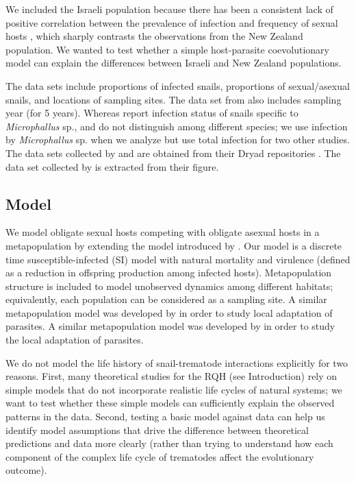 \documentclass{article}\usepackage[]{graphicx}\usepackage[]{color}
\begin{document}
We included the Israeli population because there has been a consistent lack of positive correlation between the prevalence of infection and frequency of sexual hosts \citep{heller1990sexual, ben2005spatial, ben2007temporal, ben2008sex, dagan2013clonal}, which sharply contrasts the observations from the New Zealand population.
We wanted to test whether a simple host-parasite coevolutionary model can explain the differences between 
Israeli and New Zealand populations.

The data sets include proportions of infected snails, proportions of sexual/asexual snails, and locations of sampling sites. 
The data set from \cite{vergara2014infection} also includes sampling year (for 5 years).
Whereas \cite{vergara2014infection} report infection status of snails specific to \textit{Microphallus} sp., \cite{mckone2016fine} and \cite{dagan2013clonal} do not distinguish among different species;
we use infection by \textit{Microphallus} sp. when we analyze \cite{vergara2014infection}
but use total infection for two other studies.
The data sets collected by \cite{dagan2013clonal} and \cite{vergara2014infection} are obtained from their Dryad repositories \citep{dryad_f5t56, dryad_29nk3_2}. 
The data set collected by \cite{mckone2016fine} is extracted from their figure.

\subsection{Model}

We model obligate sexual hosts competing with obligate asexual hosts in a metapopulation by extending the model introduced by \cite{lively2010epidemiological}.
Our model is a discrete time susceptible-infected (SI) model with natural mortality and virulence (defined as a reduction in offspring production among infected hosts).
Metapopulation structure is included to model unobserved dynamics among different habitats; equivalently, each population can be considered as a sampling site.
A similar metapopulation model was developed by \cite{lively2018habitat} in order to study local adaptation of parasites.
A similar metapopulation model was developed by \cite{lively2018habitat} in order to study the local adaptation of parasites.

We do not model the life history of snail-trematode interactions explicitly for 
two reasons.
First, many theoretical studies for the RQH (see Introduction) rely on simple models 
that do not incorporate realistic life cycles of natural systems; we want to test
whether these simple models can sufficiently explain the observed patterns in the data.
Second, testing a basic model against data can help us identify model assumptions
that drive the difference between theoretical predictions and data more clearly (rather
than trying to understand how each component of the complex life cycle of trematodes 
affect the evolutionary outcome).
\end{document}
